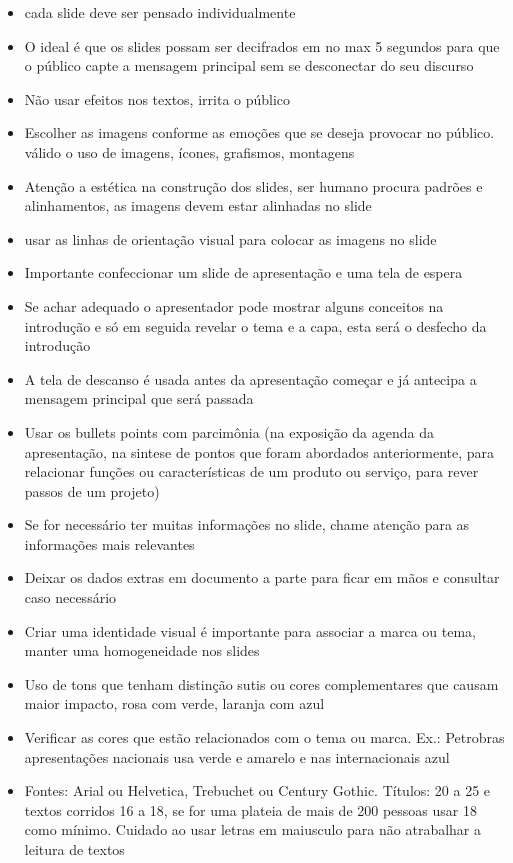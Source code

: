 \begin{itemize}
    \item cada slide deve ser pensado individualmente
    \item O ideal é que os slides possam ser decifrados em no max 5 segundos para que o público capte a mensagem principal sem se desconectar do seu discurso
    \item Não usar efeitos nos textos, irrita o público
    \item Escolher as imagens conforme as emoções que se deseja provocar no público. válido o uso de imagens, ícones, grafismos, montagens
    \item Atenção a estética na construção dos slides, ser humano procura padrões e alinhamentos, as imagens devem estar alinhadas no slide
    \item usar as linhas de orientação visual para colocar as imagens no slide
    \item Importante confeccionar um slide de apresentação e uma tela de espera
    \item Se achar adequado o apresentador pode mostrar alguns conceitos na introdução e só em seguida revelar o tema e a capa, esta será o desfecho da introdução
    \item A tela de descanso é usada antes da apresentação começar e já antecipa a mensagem principal que será passada
    \item Usar os bullets points com parcimônia (na exposição da agenda da apresentação, na sintese de pontos que foram abordados anteriormente, para relacionar funções ou características de um produto ou serviço, para rever passos de um projeto)
    \item Se for necessário ter muitas informações no slide, chame atenção para as informações mais relevantes
    \item Deixar os dados extras em documento a parte para ficar em mãos e consultar caso necessário
    \item Criar uma identidade visual é importante para associar a marca ou tema, manter uma homogeneidade nos slides
    \item Uso de tons que tenham distinção sutis ou cores complementares que causam maior impacto, rosa com verde, laranja com azul
    \item Verificar as cores que estão relacionados com o tema ou marca. Ex.: Petrobras apresentações nacionais usa verde e amarelo e nas internacionais azul 
    \item Fontes: Arial ou Helvetica, Trebuchet ou Century Gothic. Títulos: 20 a 25 e textos corridos 16 a 18, se for uma plateia de mais de 200 pessoas usar 18 como mínimo. Cuidado ao usar letras em maiusculo para não atrabalhar a leitura de textos

\end{itemize}
